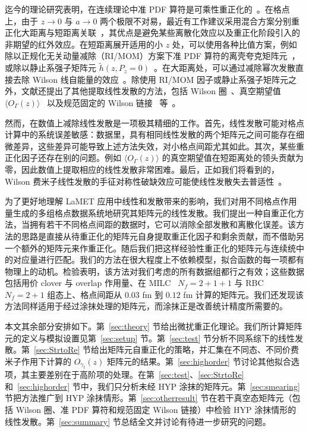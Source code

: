 迄今的理论研究表明，在连续理论中准 PDF 算符是可乘性重正化的~\cite{Ji:2015jwa, Ji:2017oey,Ishikawa:2017faj,Green:2017xeu}。在格点上，由于 $z\to 0$ 与 $a\to 0$ 两个极限不对易，最近有工作建议采用混合方案分别重正化大距离与短距离关联~\cite{Ji:2020brr}，其优点是避免某些离散化效应以及重正化阶段引入的非期望的红外效应。在短距离展开适用的小 $z$ 处，可以使用各种比值方案，例如除以正规化无关动量减除（RI/MOM）方案下准 PDF 算符的离壳夸克矩阵元~\cite{Green:2017xeu,Chen:2017mzz,Alexandrou:2017huk}，或除以静止系强子矩阵元 $\tilde{h}(z, P_z=0)$~\cite{Orginos:2017kos,Izubuchi:2018srq}。在大距离处，可以通过减除幂次发散直接去除 Wilson 线自能量的效应~\cite{Chen:2016fxx,Ji:2017oey,Ishikawa:2017faj,Green:2017xeu}。除使用 RI/MOM 因子或静止系强子矩阵元之外，文献还提出了其他提取线性发散的方法，包括 Wilson 圈~\cite{Chen:2016fxx,Zhang:2017bzy}、真空期望值 $\langle O_{\Gamma}(z)\rangle$~\cite{Braun:2018brg} 以及规范固定的 Wilson 链接~\cite{Ji:2020ect} 等~\cite{Ji:2020brr}。

然而，在数值上减除线性发散是一项极其精细的工作。首先，线性发散可能对格点计算中的系统误差敏感：数据里，具有相同线性发散的两个矩阵元之间可能存在细微差异，这些差异可能导致上述方法失效，对小格点间距尤其如此。其次，某些重正化因子还存在别的问题。例如 $\langle O_{\Gamma}(z)\rangle$ 的真空期望值在短距离处的领头贡献为零，因此数值上提取相应的线性发散非常困难。最后，正如我们将看到的，Wilson 费米子线性发散的手征对称性破缺效应可能使线性发散失去普适性~\cite{Zhang:2020rsx}。

为了更好地理解 LaMET 应用中线性和发散带来的影响，我们对用不同格点作用量生成的多组格点数据系统地研究其矩阵元的线性发散。我们提出一种自重正化方法，当拥有若干不同格点间距的数据时，它可以消除全部发散和离散化误差。该方法的思路是直接从待重正化的矩阵元自身提取重正化因子和剩余贡献，而不借助另一个额外的矩阵元来作重正化。随后我们把这样经验性重正化的矩阵元与连续统中的对应量进行匹配。我们的方法在很大程度上不依赖模型，拟合函数的每一项都有物理上的动机。检验表明，该方法对我们考虑的所有数据组都行之有效；这些数据包括用价 clover 与 overlap 作用量、在 MILC~\cite{Bazavov:2012xda} $N_f=2+1+1$ 与 RBC~\cite{Blum:2014tka} $N_f=2+1$ 组态上、格点间距从 $0.03$ fm 到 $0.12$ fm 计算的矩阵元。我们还发现该方法同样适用于经过涂抹处理的矩阵元，而涂抹正是改善统计精度所需要的。

本文其余部分安排如下。第~\ref{sec:theory} 节给出微扰重正化理论。我们所计算矩阵元的定义与模拟设置见第~\ref{sec:setup} 节。第~\ref{sec:test} 节分析不同系综下的线性发散。第~\ref{sec:StrtoRe} 节给出矩阵元自重正化的策略，并汇集在不同态、不同价费米子作用下计算的 $O_{\gamma_t}(z)$ 矩阵元的结果。第~\ref{sec:highorder} 节讨论其他拟合选项，其主要差别在于高阶项的处理。在第~\ref{sec:test}、\ref{sec:StrtoRe} 和~\ref{sec:highorder} 节中，我们只分析未经 HYP 涂抹的矩阵元。第~\ref{sec:smearing} 节把方法推广到 HYP 涂抹情形。第~\ref{sec:otherresult} 节在若干真空态矩阵元（包括 Wilson 圈、准 PDF 算符和规范固定 Wilson 链接）中检验 HYP 涂抹情形的线性发散。第~\ref{sec:summary} 节总结全文并讨论有待进一步研究的问题。
